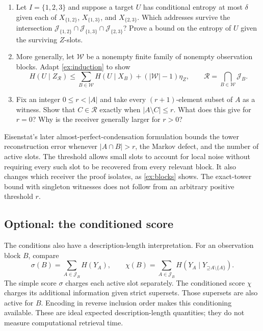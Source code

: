 \documentclass[11pt]{article}
\newcommand{\Up}{\mathord{\supseteq}}
\begin{document}
\begin{exercise}
\label{ex:blocks}
\begin{enumerate}
\item Let $I=\{1,2,3\}$ and suppose a target $U$ has conditional entropy at
most $\delta$ given each of $X_{\{1,2\}}$, $X_{\{1,3\}}$, and
$X_{\{2,3\}}$. Which addresses survive the intersection
$\mathcal{J}_{\{1,2\}}\cap\mathcal{J}_{\{1,3\}}\cap\mathcal{J}_{\{2,3\}}$?
Prove a bound on the entropy of $U$ given the surviving $Z$-slots.
\item More generally, let $\mathcal{W}$ be a nonempty finite family of nonempty
observation blocks. Adapt \cref{ex:induction} to show
\[
 H(U\mid Z_{\mathcal{R}})\le
 \sum_{B\in\mathcal{W}}H(U\mid X_B)+(|\mathcal{W}|-1)\eta_Z,
 \qquad \mathcal{R}=\bigcap_{B\in\mathcal{W}}\mathcal{J}_B.
\]
\item Fix an integer $0\le r<|A|$ and take every $(r+1)$-element subset of $A$ as a
witness. Show that $C\in\mathcal{R}$ exactly when $|A\setminus C|\le r$.
What does this give for $r=0$? Why is the receiver generally larger for $r>0$?
\end{enumerate}
\end{exercise}

Eisenstat's later almost-perfect-condensation formulation
\citep{eisenstat2025condensation} bounds the tower
reconstruction error whenever $|A\cap B|>r$, the Markov defect, and the number
of active slots. The threshold allows small slots to account for local noise
without requiring every such slot to be recovered from every relevant block.
It also changes which receiver the proof isolates, as \cref{ex:blocks} shows. The exact-tower
bound with singleton witnesses does not follow from an arbitrary positive
threshold $r$.

\subsection{Optional: the conditioned score}
\label{sec:scores}
The conditions also have a description-length interpretation. For an
observation block $B$, compare
\[
 \sigma(B)=\sum_{A\in\mathcal{J}_B}H(Y_A),\qquad
 \chi(B)=\sum_{A\in\mathcal{J}_B}H(Y_A\mid Y_{\Up A\setminus\{A\}}).
\]
The simple score $\sigma$ charges each active slot separately. The conditioned
score $\chi$ charges its additional information given strict supersets.
Those supersets are also active for $B$. Encoding in reverse inclusion order
makes this conditioning available. These are ideal expected description-length
quantities; they do not measure computational retrieval time.
\end{document}
